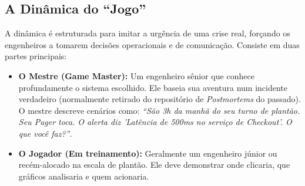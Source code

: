 \documentclass[12pt,a4paper,twoside]{report}
\begin{document}
\subsection{A Dinâmica do ``Jogo''}

A dinâmica é estruturada para imitar a urgência de uma crise real, forçando os engenheiros a tomarem decisões operacionais e de comunicação. Consiste em duas partes principais:

\begin{itemize}
    \item \textbf{O Mestre (Game Master):} Um engenheiro sênior que conhece profundamente o sistema escolhido. Ele baseia sua aventura num incidente verdadeiro (normalmente retirado do repositório de \textit{Postmortems} do passado). O mestre descreve cenários como: \textit{``São 3h da manhã do seu turno de plantão. Seu Pager toca. O alerta diz 'Latência de 500ms no serviço de Checkout'. O que você faz?''}.
    \item \textbf{O Jogador (Em treinamento):} Geralmente um engenheiro júnior ou recém-alocado na escala de plantão. Ele deve demonstrar onde clicaria, que gráficos analisaria e quem acionaria.
\end{itemize}
\end{document}
